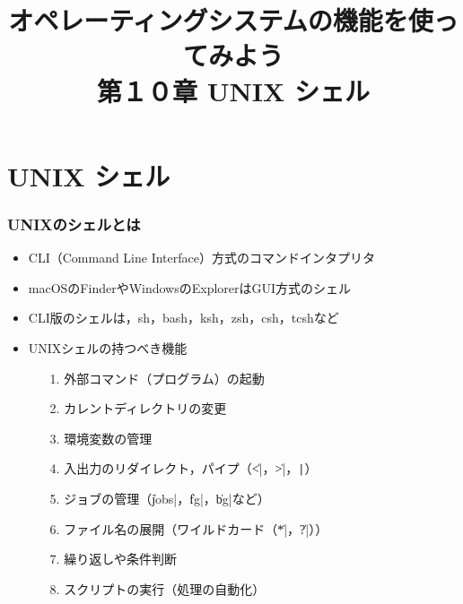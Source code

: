 \documentclass{beamer}                 %
\begin{document}
\title{オペレーティングシステムの機能を使ってみよう\\
第１０章 UNIX シェル}
\date{}

\begin{frame}
  \titlepage
\end{frame}

\section{UNIX シェル}
\begin{frame}[fragile]
  \frametitle{UNIXのシェルとは}
  \begin{itemize}
    \item CLI（Command Line Interface）方式のコマンドインタプリタ
    \item macOSのFinderやWindowsのExplorerはGUI方式のシェル
    \item CLI版のシェルは，sh，bash，ksh，zsh，csh，tcshなど
    \item UNIXシェルの持つべき機能
      \begin{enumerate}
      \item[1.] 外部コマンド（プログラム）の起動
      \item[2.] カレントディレクトリの変更
      \item[3.] 環境変数の管理
      \item[4.] 入出力のリダイレクト，パイプ（\|<|，\|>|，\verb;|;）
      \item[5.] ジョブの管理（\|jobs|，\|fg|，\|bg|など）
      \item[6.] ファイル名の展開（ワイルドカード（\|*|，\|?|））
      \item[7.] 繰り返しや条件判断
      \item[8.] スクリプトの実行（処理の自動化）
      \end{enumerate}
  \end{itemize}
  \vfill
\end{frame}
\end{document}
